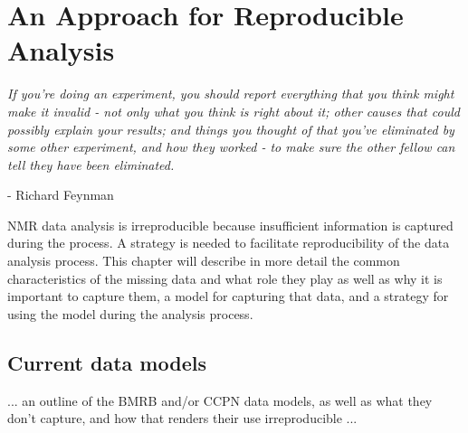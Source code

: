 \chapter{An Approach for Reproducible Analysis}

\begin{center}
  \textit{If you're doing an experiment, you should report everything that 
    you think might make it invalid - not only what you think is right about it; 
    other causes that could possibly explain your results; and things you 
    thought of that you've eliminated by some other experiment, and how they 
    worked - to make sure the other fellow can tell they have been eliminated.}

 - Richard Feynman
\end{center}



NMR data analysis is irreproducible because insufficient information is
captured during the process.  A strategy is needed to facilitate 
reproducibility of the data analysis process.
This chapter will describe in more detail the common characteristics of
the missing data and what role they play as well as why it is important to
capture them, a model for capturing that data, and a strategy for using
the model during the analysis process.


\section{Current data models}
... an outline of the BMRB and/or CCPN data models, as well as what they 
don't capture, and how that renders their use irreproducible ...






